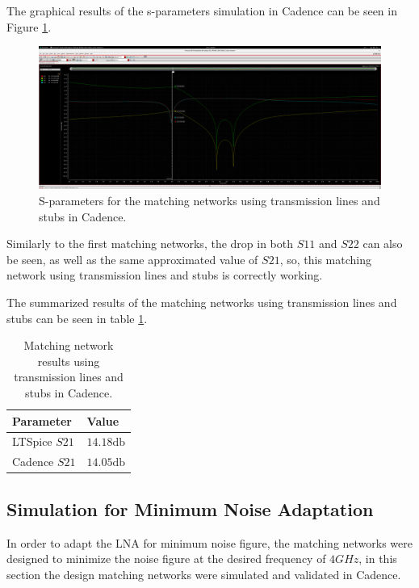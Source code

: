 The graphical results of the s-parameters simulation in Cadence can be seen in Figure \ref{fig:SIMLSMatching}.
\begin{figure}[H]
    \centering
    \includegraphics[width=1\textwidth]{Images/CAD-LinesmatchGain.png}
    \caption{S-parameters for the matching networks using transmission lines and stubs in Cadence.}
    \label{fig:SIMLSMatching}
\end{figure}

Similarly to the first matching networks, the drop in both $S11$ and $S22$ can also be seen, as well as the same approximated value of $S21$, so, this matching network using transmission lines and stubs is correctly working. 

The summarized results of the matching networks using transmission lines and stubs can be seen in table \ref{tab:LSMatchingParameters}.
\begin{table}[H]
    \centering
    \caption{Matching network results using transmission lines and stubs in Cadence.}
    \begin{tabularx}{\textwidth}{>{\centering\arraybackslash}X >{\centering\arraybackslash}X}
        \toprule
        \textbf{Parameter} & \textbf{Value} \\
        \midrule
        LTSpice $S21$  & $14.18 \si{\decibel}$ \\
        \midrule
        Cadence $S21$ & $14.05 \si{\decibel}$ \\
        \bottomrule
    \end{tabularx}
    \label{tab:LSMatchingParameters}
\end{table}

\subsection{Simulation for Minimum Noise Adaptation}

In order to adapt the LNA for minimum noise figure, the matching networks were designed to minimize the noise figure at the desired frequency of $4 GHz$, in this section the design matching networks were simulated and validated in Cadence.

